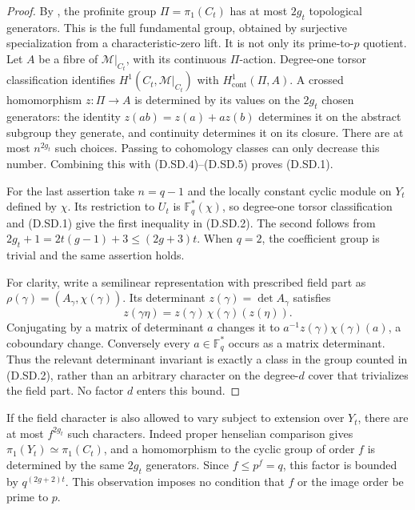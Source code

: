 \begin{proof}
By \citet[Theorem X.2.6 and its preceding complete argument,
original pp.~272--273]{SGA1}, the profinite group
$\Pi=\pi_1(C_t)$ has at most $2g_t$ topological generators.
This is the full fundamental group, obtained by surjective
specialization from a characteristic-zero lift. It is not
only its prime-to-$p$ quotient. Let $A$ be a fibre of
$\mathcal M|_{C_t}$, with its continuous $\Pi$-action.
Degree-one torsor classification identifies
$H^1(C_t,\mathcal M|_{C_t})$ with $H^1_{\mathrm{cont}}(\Pi,A)$.
A crossed homomorphism $z:\Pi\to A$ is determined by its
values on the $2g_t$ chosen generators: the identity
$z(ab)=z(a)+a z(b)$ determines it on the abstract subgroup
they generate, and continuity determines it on its closure.
There are at most $n^{2g_t}$ such choices. Passing to
cohomology classes can only decrease this number. Combining
this with (D.SD.4)--(D.SD.5) proves (D.SD.1).

For the last assertion take $n=q-1$ and the locally constant
cyclic module on $Y_t$ defined by $\chi$. Its restriction to
$U_t$ is $\mathbb F_q^*(\chi)$, so degree-one torsor
classification and (D.SD.1) give the first inequality in
(D.SD.2). The second follows from
$2g_t+1=2t(g-1)+3\leq(2g+3)t$. When $q=2$, the
coefficient group is trivial and the same assertion holds.

For clarity, write a semilinear representation with prescribed
field part as $\rho(\gamma)=(A_\gamma,\chi(\gamma))$.
Its determinant $z(\gamma)=\det A_\gamma$ satisfies
\[
 z(\gamma\eta)=z(\gamma)\,
                   \chi(\gamma)(z(\eta)).              \tag{D.SD.6}
\]
Conjugating by a matrix of determinant $a$ changes it to
$a^{-1}z(\gamma)\chi(\gamma)(a)$, a coboundary change.
Conversely every $a\in\mathbb F_q^*$ occurs as a matrix
determinant. Thus the relevant determinant invariant is
exactly a class in the group counted in (D.SD.2), rather
than an arbitrary character on the degree-$d$ cover that
trivializes the field part. No factor $d$ enters this bound.
\end{proof}

\begin{remark}
If the field character is also allowed to vary subject to
extension over $Y_t$, there are at most $f^{2g_t}$ such
characters. Indeed proper henselian comparison gives
$\pi_1(Y_t)\simeq\pi_1(C_t)$, and a homomorphism to the
cyclic group of order $f$ is determined by the same $2g_t$
generators. Since $f\leq p^f=q$, this factor is bounded by
$q^{(2g+2)t}$. This observation imposes no condition that
$f$ or the image order be prime to $p$.
\end{remark}
